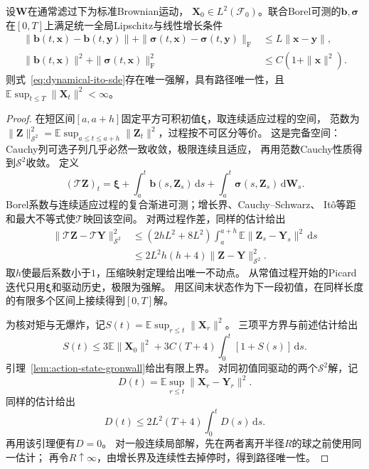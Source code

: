 \begin{theorem}[SDE强解的存在唯一性]
 \label{thm:dynamical-sde-strong-existence}
 设$\bm W$在通常滤过下为标准Brownian运动，
 $\bm X_0\in L^2(\mathcal F_0)$。联合Borel可测的$\bm b,\bm\sigma$
 在$[0,T]$上满足统一全局Lipschitz与线性增长条件
 \begin{align*}
 \|\bm b(t,\bm x)-\bm b(t,\bm y)\|
 +\|\bm\sigma(t,\bm x)-\bm\sigma(t,\bm y)\|_{\mathrm F}
    &\leq L\|\bm x-\bm y\|,\\
 \|\bm b(t,\bm x)\|^2+\|\bm\sigma(t,\bm x)\|_{\mathrm F}^2
    &\leq C(1+\|\bm x\|^2).
 \end{align*}
 则式~\eqref{eq:dynamical-ito-sde}存在唯一强解，具有路径唯一性，且
 $\mathbb E\sup_{t\leq T}\|\bm X_t\|^2<\infty$。
\end{theorem}
\begin{proof}
 在短区间$[a,a+h]$固定平方可积初值$\bm\xi$，取连续适应过程的空间，
 范数为$\|\bm Z\|_{\mathcal S^2}^2
 =\mathbb E\sup_{a\leq t\leq a+h}\|\bm Z_t\|^2$，过程按不可区分等价。
 这是完备空间：Cauchy列可选子列几乎必然一致收敛，极限连续且适应，
 再用范数Cauchy性质得到$\mathcal S^2$收敛。
 定义
 \[
  (\mathcal T\bm Z)_t=\bm\xi+\int_a^t\bm b(s,\bm Z_s)\,\mathrm ds
                         +\int_a^t\bm\sigma(s,\bm Z_s)\,\mathrm d\bm W_s.
 \]
 Borel系数与连续适应过程的复合渐进可测；增长界、Cauchy--Schwarz、
 Itô等距和最大不等式使$\mathcal T$映回该空间。
 对两过程作差，同样的估计给出
 \[
 \begin{aligned}
 \|\mathcal T\bm Z-\mathcal T\bm Y\|_{\mathcal S^2}^2
 &\leq(2hL^2+8L^2)\int_a^{a+h}
                   \mathbb E\|\bm Z_s-\bm Y_s\|^2\,\mathrm ds\\
 &\leq2L^2h(h+4)\|\bm Z-\bm Y\|_{\mathcal S^2}^2.
 \end{aligned}
 \]
 取$h$使最后系数小于$1$，压缩映射定理给出唯一不动点。
 从常值过程开始的Picard迭代只用$\bm\xi$和驱动历史，极限为强解。
 用区间末状态作为下一段初值，在同样长度的有限多个区间上接续得到$[0,T]$解。

 为核对矩与无爆炸，记$S(t)=\mathbb E\sup_{r\leq t}\|\bm X_r\|^2$。
 三项平方界与前述估计给出
 \[
  S(t)\leq3\mathbb E\|\bm X_0\|^2
       +3C(T+4)\int_0^t[1+S(s)]\,\mathrm ds.
 \]
 引理~\ref{lem:action-state-gronwall}给出有限上界。
 对同初值同驱动的两个$\mathcal S^2$解，记
 \[
  D(t)=\mathbb E\sup_{r\leq t}\|\bm X_r-\bm Y_r\|^2.
 \]
 同样的估计给出
 \[
  D(t)\leq2L^2(T+4)\int_0^tD(s)\,\mathrm ds.
 \]
 再用该引理便有$D=0$。
 对一般连续局部解，先在两者离开半径$R$的球之前使用同一估计；
 再令$R\uparrow\infty$，由增长界及连续性去掉停时，得到路径唯一性。
\end{proof}

